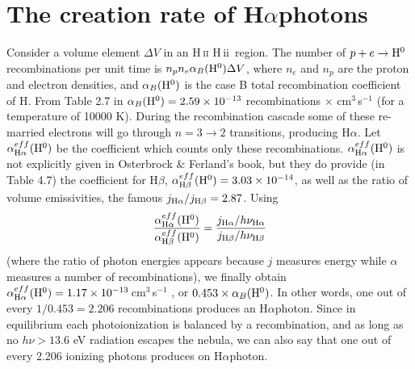 \documentclass[12pt,letterpaper,usenatbib,useAMS]{article}
\def\Ha{\ifmmode \mathrm{H}\alpha \else H$\alpha$\xspace \fi}
\def\Hb{\ifmmode \mathrm{H}\beta \else H$\beta$\xspace \fi}
\def\Hii{\ifmmode \rm{H}\,\textsc{ii} \else H\,{\sc ii}\fi}
\begin{document}
\section{The creation rate of \Ha photons}
\label{app:Ha}

Consider a volume element $\Delta V$ in an \Hii\ region. The number of $p + e \rightarrow {\rm H}^0$ recombinations per unit time is $n_p n_e \alpha_B({\rm H}^0) \Delta V$, where $n_e$ and $n_p$ are the proton and electron densities, and $\alpha_B({\rm H}^0)$ is the case B total recombination coefficient of H. From Table 2.7 in \citet{Osterbrock.Ferland.2006a} $\alpha_B({\rm H}^0) = 2.59\times10^{-13}$ recombinations$\,\times\,$cm$^3\,$s$^{-1}$ (for a temperature of 10000 K). During the recombination cascade some of these re-married electrons will go through  $n = 3 \rightarrow 2$ transitions, producing \Ha. Let $\alpha_{\Ha}^{eff}({\rm H}^0)$ be the coefficient which counts only these recombinations. $\alpha_{\Ha}^{eff}({\rm H}^0)$ is not explicitly given in Osterbrock \& Ferland's book, but they do provide (in Table 4.7) the coefficient for \Hb, $\alpha_{\Hb}^{eff}({\rm H}^0) = 3.03\times10^{-14}$, as well as the ratio of volume emissivities, the famous $j_{\Ha}/j_{\Hb} = 2.87$. Using
$$
\frac{ \alpha_{\Ha}^{eff}({\rm H}^0) }{ \alpha_{\Hb}^{eff}({\rm H}^0) } = \frac{ j_{\Ha} / h\nu_{\Ha} }{ j_{\Hb} / h\nu_{\Hb} }
$$
\noident (where the ratio of photon energies appears because $j$ measures energy while $\alpha$ measures a number of recombinations), we finally obtain $\alpha_{\Ha}^{eff}({\rm H}^0) = 1.17\times10^{-13} \,$cm$^3\,$s$^{-1}$ , or $0.453 \times \alpha_B({\rm H}^0)$. In other words, one out of every $1/0.453 = 2.206$ recombinations produces an \Ha photon. Since in equilibrium each photoionization is balanced by a recombination, and as long as no $h\nu > 13.6$ eV radiation escapes the nebula, we can also say that one out of every 2.206 ionizing photons produces on \Ha photon.
\end{document}
